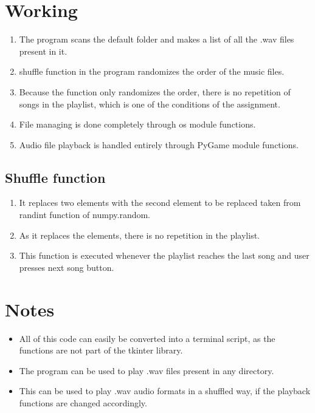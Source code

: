 \documentclass{article}
\begin{document}
\section{Working}
\begin{enumerate}
\item The program scans the default folder and makes a list of all the .wav files present in it.
\item shuffle function in the program randomizes the order of the music files.
\item Because the function only randomizes the order, there is no repetition of songs in the playlist, which is one of the conditions of the assignment.
\item File managing is done completely through os module functions.
\item Audio file playback is handled entirely through PyGame module functions.
\end{enumerate}
\subsection{Shuffle function}
\begin{enumerate}
\item It replaces two elements with the second element to be replaced taken from randint function of numpy.random.
\item As it replaces the elements, there is no repetition in the playlist.
\item This function is executed whenever the playlist reaches the last song and user presses next song button.
\end{enumerate}
\section{Notes}
\begin{itemize}
\item All of this code can easily be converted into a terminal script, as the functions are not part of the tkinter library.
\item The program can be used to play .wav files present in any directory.
\item This can be used to play .wav audio formats in a shuffled way, if the playback functions are changed accordingly.
\end{itemize}
\end{document}
